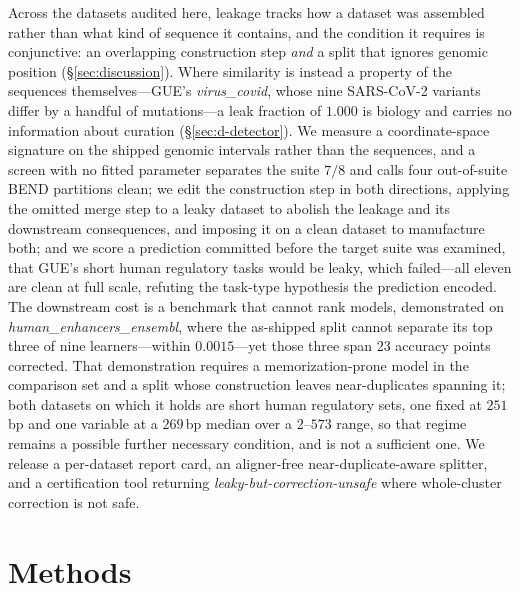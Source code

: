 \documentclass[webpdf,modern,large,namedate]{oup-authoring-template}%
\begin{document}
Across the datasets audited here, leakage tracks how a dataset was assembled rather than what kind of sequence it contains, and the condition it requires is conjunctive: an overlapping construction step \emph{and} a split that ignores genomic position (\S\ref{sec:discussion}). Where similarity is instead a property of the sequences themselves---GUE's \textit{virus\_covid}, whose nine SARS-CoV-2 variants differ by a handful of mutations---a leak fraction of $1.000$ is biology and carries no information about curation (\S\ref{sec:d-detector}). We measure a coordinate-space signature on the shipped genomic intervals rather than the sequences, and a screen with no fitted parameter separates the suite $7/8$ and calls four out-of-suite BEND partitions clean; we edit the construction step in both directions, applying the omitted merge step to a leaky dataset to abolish the leakage and its downstream consequences, and imposing it on a clean dataset to manufacture both; and we score a prediction committed before the target suite was examined, that GUE's short human regulatory tasks would be leaky, which failed---all eleven are clean at full scale, refuting the task-type hypothesis the prediction encoded. The downstream cost is a benchmark that cannot rank models, demonstrated on \textit{human\_enhancers\_ensembl}, where the as-shipped split cannot separate its top three of nine learners---within $0.0015$---yet those three span $23$ accuracy points corrected. That demonstration requires a memorization-prone model in the comparison set and a split whose construction leaves near-duplicates spanning it; both datasets on which it holds are short human regulatory sets, one fixed at $251$\,bp and one variable at a $269$\,bp median over a $2$--$573$ range, so that regime remains a possible further necessary condition, and is not a sufficient one. We release a per-dataset report card, an aligner-free near-duplicate-aware splitter, and a certification tool returning \emph{leaky-but-correction-unsafe} where whole-cluster correction is not safe.

\section{Methods}\label{sec:methods}
\end{document}
